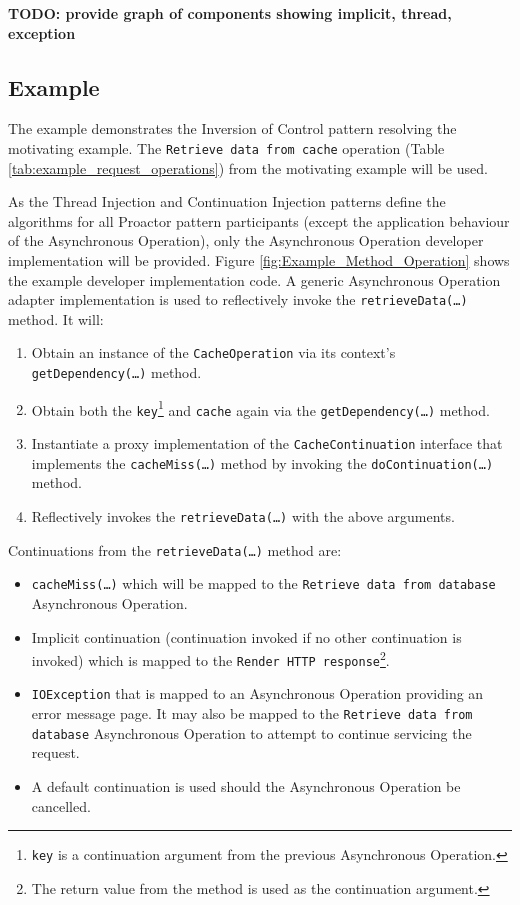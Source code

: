 \documentclass[prodmode]{style/acmlarge}
\begin{document}
\textbf{TODO: provide graph of components showing implicit, thread, exception}


\subsection{Example}

The example demonstrates the Inversion of Control pattern resolving the
motivating example.  The \texttt{Retrieve data from cache} operation (Table
\ref{tab:example_request_operations}) from the motivating example will be used.  

As the Thread Injection and Continuation Injection patterns define the
algorithms for all Proactor pattern participants (except the application
behaviour of the Asynchronous Operation), only the Asynchronous Operation
developer implementation will be provided.  Figure
\ref{fig:Example_Method_Operation} shows the example developer implementation
code.  A generic Asynchronous Operation adapter implementation is used to
reflectively invoke the \texttt{retrieveData(\ldots)} method. It will:
\begin{enumerate}
  \item Obtain an instance of the \texttt{CacheOperation} via its context's \texttt{getDependency(\ldots)} method.
  \item Obtain both the \texttt{key}\footnote{\texttt{key} is a continuation argument from the previous Asynchronous Operation.} and \texttt{cache} again via the \texttt{getDependency(\ldots)} method.
  \item Instantiate a proxy implementation of the \texttt{CacheContinuation} interface that implements the \texttt{cacheMiss(\ldots)} method by invoking the \texttt{doContinuation(\ldots)} method. 
  \item Reflectively invokes the \texttt{retrieveData(\ldots)} with the above arguments.
\end{enumerate}

Continuations from the \texttt{retrieveData(\ldots)} method are:
\begin{itemize}
  \item \texttt{cacheMiss(\ldots)} which will be mapped to the \texttt{Retrieve data from database} Asynchronous Operation.
  \item Implicit continuation (continuation invoked if no other continuation is invoked) which is mapped to the \texttt{Render HTTP response}\footnote{The return value from the method is used as the continuation argument.}.
  \item \texttt{IOException} that is mapped to an Asynchronous Operation providing an error message page.  It may also be mapped to the \texttt{Retrieve data from database} Asynchronous Operation to attempt to continue servicing the request.
  \item A default continuation is used should the Asynchronous Operation be cancelled.
\end{itemize}
\end{document}
